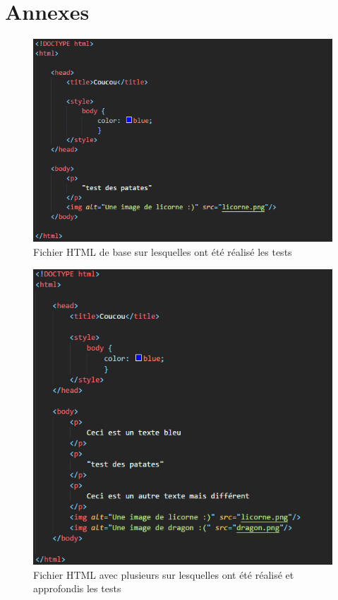 \titleformat{\chapter}[display]
  {\normalfont\bfseries}{}{0pt}{\Large}


\chapter{Annexes}

\begin{figure}[ht]
\centering
\includegraphics[height=0.8\textwidth]{html1.png}
\caption{\label{fig:html1}Fichier HTML de base sur lesquelles ont été réalisé les tests}
\end{figure}

\begin{figure}[ht]
\centering
\includegraphics[height=1\textwidth]{html3.png}
\caption{\label{fig:html2}Fichier HTML avec plusieurs sur lesquelles ont été réalisé et approfondis les tests}
\end{figure}

